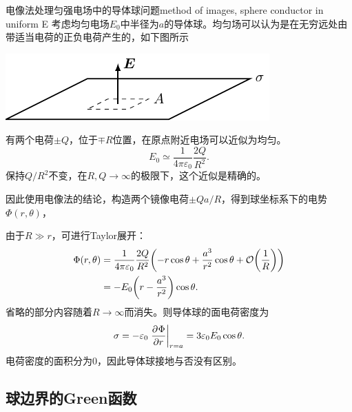 \begin{example}{电像法处理匀强电场中的导体球问题}{method of images, sphere conductor in uniform E}
    考虑均匀电场$E_0$中半径为$a$的导体球。均匀场可以认为是在无穷远处由带适当电荷的正负电荷产生的，如下图所示
    \begin{center}
        \includegraphics[page=9]{figures/tikz/layouts.pdf}
        \label{fig:uniform E approx +-q}
    \end{center}
    有两个电荷$\pm Q$，位于$\mp R$位置，在原点附近电场可以近似为均匀。
    \[
        E_0\simeq\frac1{4\pi\varepsilon_0}\frac{2Q}{R^2}.
    \]
    保持$Q/R^2$不变，在$R,Q\to\infty$的极限下，这个近似是精确的。

    因此使用电像法的结论，构造两个镜像电荷$\pm Qa/R$，得到球坐标系下的电势$\Phi(r,\theta)$，

    由于$R\gg r$，可进行Taylor展开：
    \begin{align}
        \notag
        \Phi(r,\theta)&=\frac1{4\pi\varepsilon_0}\frac{2Q}{R^2}\biggl(-r\cos\theta+\frac{a^3}{r^2}\cos\theta+\mathcal O\biggl(\frac1R\biggr)\biggr)\\
        &=-E_0\biggl(r-\frac{a^3}{r^2}\biggr)\cos\theta.
    \end{align}
    省略的部分内容随着$R\to\infty$而消失。则导体球的面电荷密度为
    \begin{equation}
        \sigma=-\varepsilon_0\left.\frac{\partial^{{}}\Phi}{\partial{r}^{{}}}\right\rvert_{r=a}=3\varepsilon_0E_0\cos\theta.
    \end{equation}
    电荷密度的面积分为0，因此导体球接地与否没有区别。
\end{example}

\subsection{球边界的Green函数}
\label{ssec:Green function, sphere}

